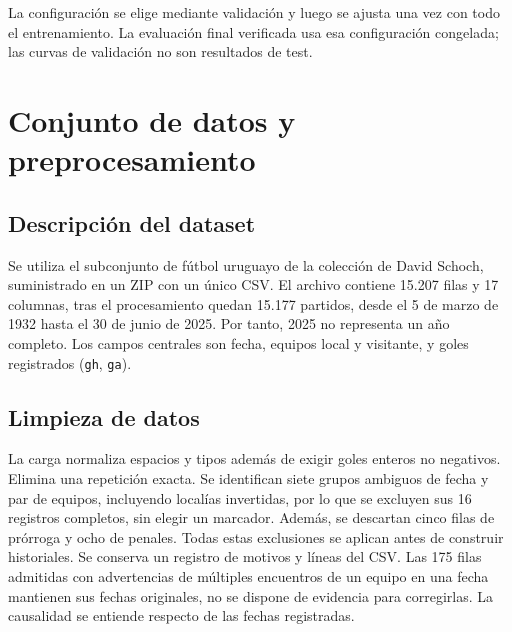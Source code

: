 \documentclass[conference]{IEEEtran}
\begin{document}
La configuración se elige mediante validación y luego se ajusta una vez con todo el entrenamiento. La evaluación final verificada usa esa configuración congelada; las curvas de validación no son resultados de test.

\section{Conjunto de datos y preprocesamiento}
\label{sec:preprocesamiento}

\subsection{Descripción del dataset}
Se utiliza el subconjunto de fútbol uruguayo de la colección de David Schoch\cite{b1}, suministrado en un ZIP con un único CSV. El archivo contiene 15.207 filas y 17 columnas, tras el procesamiento quedan 15.177 partidos, desde el 5 de marzo de 1932 hasta el 30 de junio de 2025. Por tanto, 2025 no representa un año completo. Los campos centrales son fecha, equipos local y visitante, y goles registrados (\texttt{gh}, \texttt{ga}).

\subsection{Limpieza de datos}
La carga normaliza espacios y tipos además de exigir goles enteros no negativos. Elimina una repetición exacta. Se identifican siete grupos ambiguos de fecha y par de equipos, incluyendo localías invertidas, por lo que se excluyen sus 16 registros completos, sin elegir un marcador. Además, se descartan cinco filas de prórroga y ocho de penales. Todas estas exclusiones se aplican antes de construir historiales. Se conserva un registro de motivos y líneas del CSV. Las 175 filas admitidas con advertencias de múltiples encuentros de un equipo en una fecha mantienen sus fechas originales, no se dispone de evidencia para corregirlas. La causalidad se entiende respecto de las fechas registradas.
\end{document}
